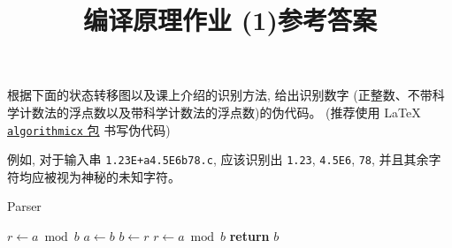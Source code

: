 \documentclass[a4paper, justified]{tufte-handout}
\title{编译原理作业 (1)参考答案}
\date{\zhtoday}
\begin{document}
\maketitle

\begin{answer}[手写词法分析器--5分]
  根据下面的状态转移图以及课上介绍的识别方法, 给出识别数字
  (正整数、不带科学计数法的浮点数以及带科学计数法的浮点数)的伪代码。
  (推荐使用 \LaTeX{} 
  \href{http://tug.ctan.org/macros/latex/contrib/algorithmicx/algorithmicx.pdf}{\texttt{algorithmicx} 包}
  书写伪代码)


  例如, 对于输入串 \texttt{1.23E+a4.5E6b78.c}, 
  应该识别出 \texttt{1.23}, \texttt{4.5E6}, \texttt{78},
  并且其余字符均应被视为神秘的未知字符。
\end{answer}
\begin{solution}
  \begin{algorithm}
    \caption{Parser}
    \begin{algorithmic}[1]
    \State $r\gets a\bmod b$
    \State $a\gets b$
    \State $b\gets r$
    \State $r\gets a\bmod b$
    \EndWhile
    \State \textbf{return} $b$
    \EndProcedure
    \end{algorithmic}
 
  \end{algorithm}
\end{solution}
\end{document}

